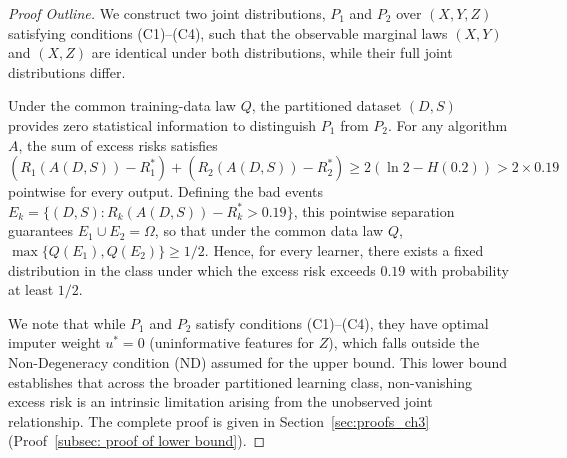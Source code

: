 \begin{proof}[Proof Outline]
We construct two joint distributions, $P_1$ and $P_2$ over $(X, Y, Z)$ satisfying conditions (C1)--(C4), such that the observable marginal laws $(X, Y)$ and $(X, Z)$ are identical under both distributions, while their full joint distributions differ.

Under the common training-data law $Q$, the partitioned dataset $(D,S)$ provides zero statistical information to distinguish $P_1$ from $P_2$. For any algorithm $A$, the sum of excess risks satisfies $(R_1(A(D,S)) - R_1^*) + (R_2(A(D,S)) - R_2^*) \ge 2(\ln 2 - H(0.2)) > 2 \times 0.19$ pointwise for every output. Defining the bad events $E_k = \{(D,S) : R_k(A(D,S)) - R_k^* > 0.19\}$, this pointwise separation guarantees $E_1 \cup E_2 = \Omega$, so that under the common data law $Q$, $\max\{Q(E_1), Q(E_2)\} \ge 1/2$. Hence, for every learner, there exists a fixed distribution in the class under which the excess risk exceeds $0.19$ with probability at least $1/2$. 

We note that while $P_1$ and $P_2$ satisfy conditions (C1)--(C4), they have optimal imputer weight $u^* = 0$ (uninformative features for $Z$), which falls outside the Non-Degeneracy condition (ND) assumed for the upper bound. This lower bound establishes that across the broader partitioned learning class, non-vanishing excess risk is an intrinsic limitation arising from the unobserved joint relationship.
The complete proof is given in Section~\ref{sec:proofs_ch3} (Proof~\ref{subsec: proof of lower bound}).
\end{proof}
